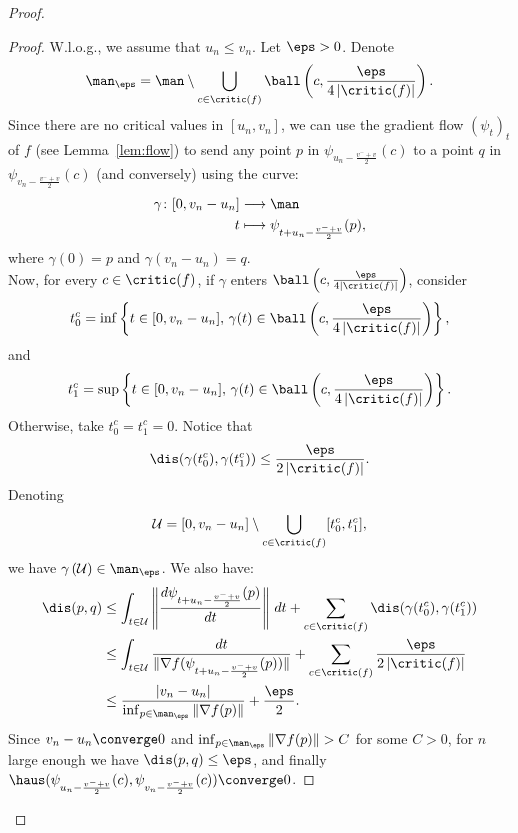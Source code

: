 \begin{proof}
\begin{proof}
W.l.o.g., we assume that $u_n\leq v_n$. 
Let $\eps>0$. Denote $$\man_\eps=\man\setminus\bigcup_{c\in\critic(f)}\ball\left(c,\frac{\eps}{4\left|\critic(f)\right|}\right).$$ 
Since there are no critical values in $[u_n,v_n]$, we can use the gradient flow $(\psi_t)_t$ of $f$ (see Lemma~\ref{lem:flow}) to send any point $p$ in $\psi_{u_n-\frac{v^-+v}{2}}(c)$ to a point $q$ in $\psi_{v_n-\frac{v^-+v}{2}}(c)$ (and conversely) using the curve:
 \begin{align*}
 \gamma\colon[0,v_n-u_n]&\longrightarrow \man\\
 t&\longmapsto\psi_{t+u_n-\frac{v^-+v}{2}}(p),
 \end{align*}
where $\gamma(0)=p$ and $\gamma(v_n-u_n)=q$.\\
Now, for every $c\in\critic(f)$, if $\gamma$ enters $\ball\left(c,\frac{\eps}{4\left|\critic(f)\right|}\right)$, consider 
$$t^c_0=\inf\left\{t\in[0,v_n-u_n],\,\gamma(t)\in \ball\left(c,\frac{\eps}{4\left|\critic(f)\right|}\right)\right\},$$
and 
$$t^c_1=\sup\left\{t\in[0,v_n-u_n],\,\gamma(t)\in \ball\left(c,\frac{\eps}{4\left|\critic(f)\right|}\right)\right\}.$$
Otherwise, take $t^c_0=t^c_1=0$.
Notice that
$$\dis(\gamma(t^c_0),\gamma(t^c_1))\leq \frac{\eps}{2\left|\critic(f)\right|}.$$
 Denoting
 $$\mathcal{U}=[0,v_n-u_n]\setminus\bigcup_{c \in \critic(f)}[t^c_0,t^c_1],$$
 we have $\gamma\left(\mathcal{U}\right)\in\man_\eps$. We also  have:
\begin{align*}
\dis(p,q)&\leq\int_{t\in \mathcal{U}}\left\Vert\frac{d\psi_{t+u_n-\frac{v^-+v}{2}}(p)}{dt}\right\Vert\,dt + \sum_{c \in \critic(f)} \dis(\gamma(t^c_0),\gamma(t^c_1)) \\
&\leq\int_{t\in \mathcal{U}}\frac{dt}{\Vert\nabla f(\psi_{t+u_n-\frac{v^-+v}{2}}(p))\Vert} + \sum_{c \in \critic(f)} \frac{\eps}{2\left|\critic(f)\right|}\\
&\leq\frac{|v_n-u_n|}{\inf_{p\in\man_\eps}\Vert\nabla f(p)\Vert}+ \frac{\eps}{2}.
\end{align*}
Since $v_n-u_n\converge 0$ and $\inf_{p\in\man_\eps}\Vert\nabla f(p)\Vert > C$ for some $C>0$, for $n$ large enough we have $\dis(p,q)\leq\eps$, and finally $\haus(\psi_{u_n-\frac{v^-+v}{2}}(c),\psi_{v_n-\frac{v^-+v}{2}}(c))\converge 0$.

\end{proof}


\end{proof}
